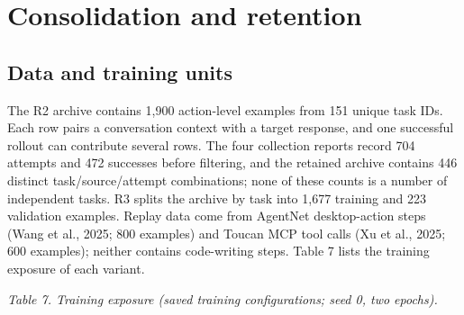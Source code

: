 \documentclass[
  10pt,
]{article}
\newcounter{none} %
\begin{document}
\section{Consolidation and retention}\label{consolidation-and-retention}

\subsection{Data and training units}\label{data-and-training-units}

The R2 archive contains 1,900 action-level examples from 151 unique task
IDs. Each row pairs a conversation context with a target response, and
one successful rollout can contribute several rows. The four collection
reports record 704 attempts and 472 successes before filtering, and the
retained archive contains 446 distinct task/source/attempt combinations;
none of these counts is a number of independent tasks. R3 splits the
archive by task into 1,677 training and 223 validation examples. Replay
data come from AgentNet desktop-action steps (Wang et al., 2025; 800
examples) and Toucan MCP tool calls (Xu et al., 2025; 600 examples);
neither contains code-writing steps. Table 7 lists the training exposure
of each variant.

\emph{Table 7. Training exposure (saved training configurations; seed 0,
two epochs).}
\end{document}
